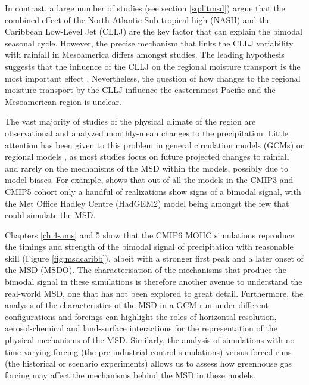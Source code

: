 In contrast, a large number of studies (see section \ref{sq:litmsd}) argue that the combined effect of the North Atlantic Sub-tropical high (NASH) and the Caribbean Low-Level Jet (CLLJ) are the key factor that can explain the bimodal seasonal cycle. However, the precise mechanism that links the CLLJ variability with rainfall in Mesoamerica differs amongst studies. The leading hypothesis suggests that the influence of the CLLJ on the regional moisture transport is the most important effect \citep{duranquesada2017,martinez2019}. Nevertheless, the question of how changes to the regional moisture transport by the CLLJ influence the easternmost Pacific and the Mesoamerican region is unclear.



  The vast majority of studies of the physical climate of the region are observational and analyzed monthly-mean changes to the precipitation. 
Little attention has been given to this problem in general circulation models (GCMs) or regional models \citep[e.g.][]{rauscher2008,ryu2014,fuentes2015inter,colorado2018}, as most studies focus on future projected changes to rainfall and rarely on the mechanisms of the MSD within the models, possibly due to model biases. For example, \cite{ryu2014} shows that out of all the models in the CMIP3 and CMIP5 cohort only a handful of realizations show signs of a bimodal signal, with the Met Office Hadley Centre (HadGEM2) model being amongst the few that could simulate the MSD. 




 Chapters \ref{ch:4-ams} and 5 show that the CMIP6 MOHC simulations reproduce the timings and strength of the bimodal signal of precipitation with reasonable skill (Figure \ref{fig:msdcaribb}), albeit with a stronger first peak and a later onset of the MSD (MSDO). 
 The characterisation of the mechanisms that produce the bimodal signal in these simulations is therefore another avenue to understand the real-world MSD, one that has not been explored to great detail. Furthermore, the analysis of the characteristics of the MSD in a GCM run under different configurations and forcings can highlight the roles of horizontal resolution, aerosol-chemical and land-surface interactions for the representation of the physical mechanisms of the MSD. Similarly, the analysis of simulations with no time-varying forcing (the pre-industrial control simulations) versus forced runs (the historical or scenario experiments) allows us to assess how greenhouse gas forcing may affect the mechanisms behind the MSD in these models.  
 
